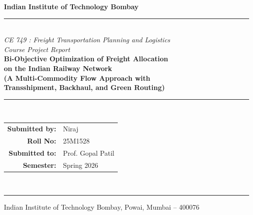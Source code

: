 \documentclass[11pt, a4paper]{article}
\numberwithin{equation}{section}
\numberwithin{figure}{section}
\numberwithin{table}{section}
\begin{document}
\begin{titlepage}
    \begin{center}
        \vspace*{0.5cm}

        {\Large \textbf{Indian Institute of Technology Bombay}} \\[0.3cm]
        
        \rule{\linewidth}{0.5pt} \\[0.5cm]

        {\large\textit{CE 749 : Freight Transportation Planning and Logistics}} \\[0.3cm]
        {\large \textit{Course Project Report}} \\[1.5cm]

        {\LARGE \textbf{Bi-Objective Optimization of Freight Allocation}} \\[0.4cm]
        {\LARGE \textbf{on the Indian Railway Network}} \\[0.8cm]
        {\Large \textbf{(A Multi-Commodity Flow Approach with}} \\[0.3cm]
        {\Large \textbf{Transshipment, Backhaul, and Green Routing)}} \\[2.0cm]

        \rule{\linewidth}{0.5pt} \\[0.8cm]

        \begin{tabular}{rl}
            \textbf{Submitted by:}  & Niraj  \\
            \textbf{Roll No:}       & 25M1528 \\
            \textbf{Submitted to:}  & Prof. Gopal Patil \\
            \textbf{Semester:}          & Spring 2026 \\
        \end{tabular} \\[2.0cm]

        \rule{\linewidth}{0.5pt}

        \vfill
        {\small Indian Institute of Technology Bombay, Powai, Mumbai -- 400076}
    \end{center}
\end{titlepage}

\newpage
{}
\setcounter{page}{1}
\end{document}
